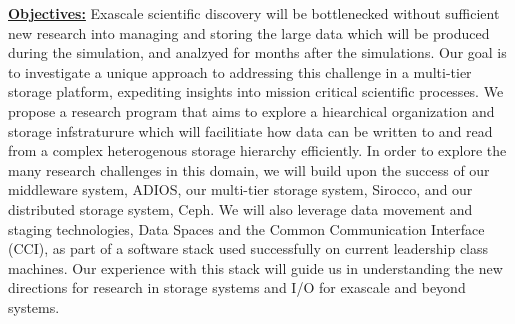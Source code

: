 \documentclass[11pt,letterpaper]{article}
\begin{document}
\underline{\textbf{Objectives:}} Exascale scientific discovery will
be bottlenecked 
without sufficient new research into managing and storing the large data which will be
produced during the simulation, and analzyed for months after the simulations.
Our goal is to investigate a unique approach to addressing this challenge in
a multi-tier storage platform, expediting insights into mission critical
scientific processes. 
%
We propose a research program that aims to explore a hiearchical
organization and storage infstraturure which will facilitiate how data can
be written to and read from a complex heterogenous storage hierarchy
efficiently. In order to explore the many research challenges in this
domain, we will build upon the success of our middleware system, ADIOS, our
multi-tier storage system, Sirocco, and our distributed storage system,
Ceph.  We will also leverage data movement and staging technologies, Data
Spaces and the Common Communication Interface (CCI), as part of a software
stack used successfully on current leadership class machines. Our experience
with this stack will guide us in understanding the new directions for
research in storage systems and I/O for exascale and beyond systems.

\end{document}
